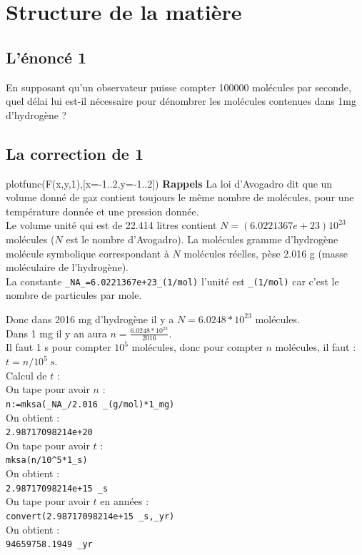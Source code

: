 \documentclass[a4paper,11pt]{book}
\begin{document}
\section{Structure de la mati\`ere}
\subsection{L'\'enonc\'e 1}
En supposant qu'un observateur puisse compter 100000 mol\'ecules par seconde, 
quel d\'elai lui est-il n\'ecessaire pour d\'enombrer les mol\'ecules contenues
dans 1mg d'hydrog\`ene ?
\subsection{La correction de 1}plotfunc(F(x,y,1),[x=-1..2,y=-1..2])
{\bf Rappels}
La loi d'Avogadro dit que un volume donn\'e de gaz contient toujours le m\^eme 
nombre de mol\'ecules, pour une temp\'erature donn\'ee et une pression 
donn\'ee.\\
Le volume unit\'e qui est de 22.414 litres contient $N=(6.0221367e+23)10^{23}$
mol\'ecules ($N$ est le nombre d'Avogadro). La mol\'ecules gramme 
d'hydrog\`ene mol\'ecule symbolique correspondant \`a $N$ mol\'ecules 
r\'eelles, p\`ese 2.016 g (masse mol\'eculaire de l'hydrog\`ene).\\
La constante {\tt \_NA\_=6.0221367e+23\_(1/mol)} l'unit\'e est  {\tt \_(1/mol)}
car c'est le nombre de particules par mole.

Donc dans 2016 mg d'hydrog\`ene il y a $N= 6.0248*10^{23}$ mol\'ecules.\\
Dans 1 mg il y an aura $n=\frac{6.0248*10^{23}}{2016}$.\\
Il faut 1 s pour compter $10^5$ mol\'ecules, donc pour compter $n$ mol\'ecules,
il faut : $t=n/10^5\ s$.\\
Calcul de $t$ :\\
On tape pour avoir $n$ :\\
{\tt n:=mksa(\_NA\_/2.016 \_(g/mol)*1\_mg)}\\   
On obtient :\\
{\tt 2.98717098214e+20}\\
On tape pour avoir $t$ :\\
{\tt mksa(n/10\verb|^|5*1\_s)}\\   
On obtient :\\
{\tt 2.98717098214e+15 \_s}\\
On tape pour avoir $t$ en ann\'ees :\\
{\tt convert(2.98717098214e+15 \_s,\_yr)} \\  
On obtient :\\
{\tt 94659758.1949 \_yr}
\end{document}
